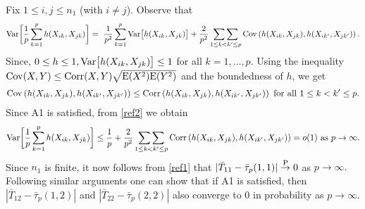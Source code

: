 \documentclass[twoside]{article}
\newcommand{\0}{\mathbf{0}}
\newcommand{\1}{\mathbf{1}}
\numberwithin{equation}{section}
\begin{document}
\begin{enumerate}[(a)]
Fix $1\leq i,j\leq n_1$ (with $i\neq j$). Observe that
\begin{align}\label{ref2}
{\rm Var}\bigg [\frac{1}{p}\sum_{k=1}^p h(X_{ik},X_{jk})\bigg ]
=\ \frac{1}{p^2}\sum_{k=1}^p {\rm Var}\big [h(X_{ik},X_{jk})\big ]
 +\frac{2}{p^2}\mathop{\sum\sum}_{1\leq k< k^\prime\leq p} {\rm Cov}\left(h(X_{ik},X_{jk}),h(X_{ik^\prime},X_{jk^\prime})\right).
\end{align}
Since, $0\leq h\leq 1,{\rm Var}\big [h(X_{ik},X_{jk})\big ]\leq 1$ for all $k=1,\ldots,p.$ Using the inequality ${\rm Cov}(X,Y)\leq {\rm Corr}(X,Y)\sqrt{{\rm E}(X^2){\rm E}(Y^2)}$ and the boundedness of $h$, we get
\begin{align*}
{\rm Cov}\left(h(X_{ik},X_{jk}),h(X_{ik^\prime},X_{jk^\prime})\right)\leq {\rm Corr}\left(h(X_{ik},X_{jk}),h(X_{ik^\prime},X_{jk^\prime})\right)\text{ for all }1\leq k<k^\prime\leq p.
\end{align*}
Since A1 is satisfied, from \eqref{ref2} we obtain
\begin{align*}
{\rm Var}\bigg [\frac{1}{p}\sum_{k=1}^p h(X_{ik},X_{jk})\bigg ]
\leq \frac{1}{p} +\frac{2}{p^2}\mathop{\sum\sum}_{1\leq k< k^\prime\leq p} {\rm Corr}\left(h(X_{ik},X_{jk}),h(X_{ik^\prime},X_{jk^\prime})\right)
= o(1)\text{ as }p\to\infty.
\end{align*}
Since $n_1$ is finite, it now follows from \eqref{ref1} that $|\bar{T}_{11}-\bar{\tau}_p(1,1)|\stackrel{\rm P}{\to}0$ as $p\to\infty.$ Following similar arguments one can show that if A1 is satisfied, then $|\bar{T}_{12}-\bar{\tau}_p(1,2)|$ and $|\bar{T}_{22}-\bar{\tau}_p(2,2)|$ also converge to 0 in probability as $p\to\infty$.


\end{enumerate}
\end{document}
